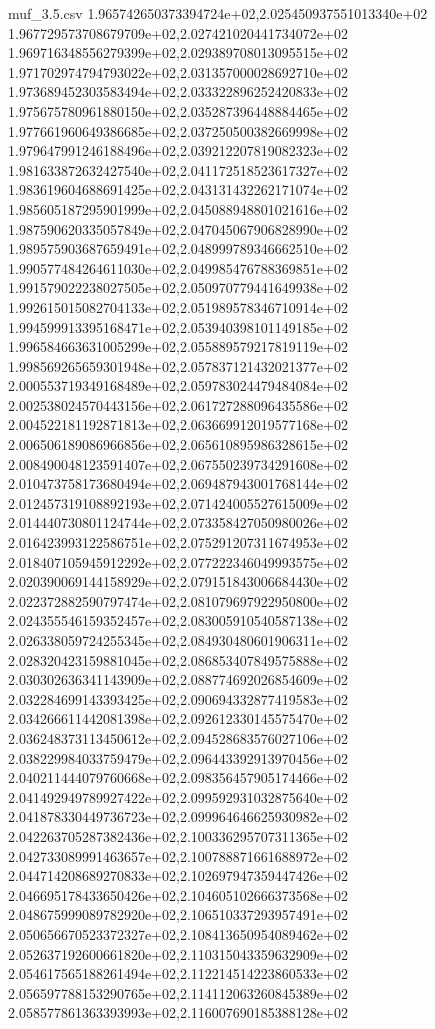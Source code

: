 \begin{filecontents*}{muf_3.5.csv}
1.965742650373394724e+02,2.025450937551013340e+02
1.967729573708679709e+02,2.027421020441734072e+02
1.969716348556279399e+02,2.029389708013095515e+02
1.971702974794793022e+02,2.031357000028692710e+02
1.973689452303583494e+02,2.033322896252420833e+02
1.975675780961880150e+02,2.035287396448884465e+02
1.977661960649386685e+02,2.037250500382669998e+02
1.979647991246188496e+02,2.039212207819082323e+02
1.981633872632427540e+02,2.041172518523617327e+02
1.983619604688691425e+02,2.043131432262171074e+02
1.985605187295901999e+02,2.045088948801021616e+02
1.987590620335057849e+02,2.047045067906828990e+02
1.989575903687659491e+02,2.048999789346662510e+02
1.990577484264611030e+02,2.049985476788369851e+02
1.991579022238027505e+02,2.050970779441649938e+02
1.992615015082704133e+02,2.051989578346710914e+02
1.994599913395168471e+02,2.053940398101149185e+02
1.996584663631005299e+02,2.055889579217819119e+02
1.998569265659301948e+02,2.057837121432021377e+02
2.000553719349168489e+02,2.059783024479484084e+02
2.002538024570443156e+02,2.061727288096435586e+02
2.004522181192871813e+02,2.063669912019577168e+02
2.006506189086966856e+02,2.065610895986328615e+02
2.008490048123591407e+02,2.067550239734291608e+02
2.010473758173680494e+02,2.069487943001768144e+02
2.012457319108892193e+02,2.071424005527615009e+02
2.014440730801124744e+02,2.073358427050980026e+02
2.016423993122586751e+02,2.075291207311674953e+02
2.018407105945912292e+02,2.077222346049993575e+02
2.020390069144158929e+02,2.079151843006684430e+02
2.022372882590797474e+02,2.081079697922950800e+02
2.024355546159352457e+02,2.083005910540587138e+02
2.026338059724255345e+02,2.084930480601906311e+02
2.028320423159881045e+02,2.086853407849575888e+02
2.030302636341143909e+02,2.088774692026854609e+02
2.032284699143393425e+02,2.090694332877419583e+02
2.034266611442081398e+02,2.092612330145575470e+02
2.036248373113450612e+02,2.094528683576027106e+02
2.038229984033759479e+02,2.096443392913970456e+02
2.040211444079760668e+02,2.098356457905174466e+02
2.041492949789927422e+02,2.099592931032875640e+02
2.041878330449736723e+02,2.099964646625930982e+02
2.042263705287382436e+02,2.100336295707311365e+02
2.042733089991463657e+02,2.100788871661688972e+02
2.044714208689270833e+02,2.102697947359447426e+02
2.046695178433650426e+02,2.104605102666373568e+02
2.048675999089782920e+02,2.106510337293957491e+02
2.050656670523372327e+02,2.108413650954089462e+02
2.052637192600661820e+02,2.110315043359632909e+02
2.054617565188261494e+02,2.112214514223860533e+02
2.056597788153290765e+02,2.114112063260845389e+02
2.058577861363393993e+02,2.116007690185388128e+02

\end{filecontents*}
